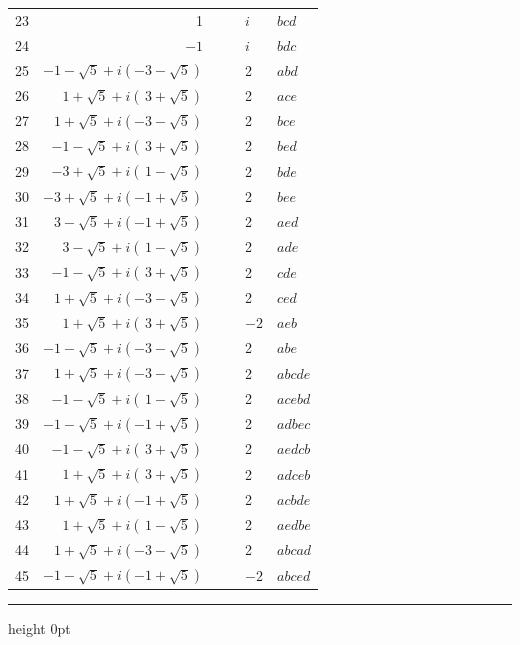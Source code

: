 \documentclass[11pt,a4paper]{article}
\begin{document}
\begin{center}
\begin{longtable}{r|r|l|l|l|l}
23 & 1 & & & $i$ & $bcd$\\
24 & $-1$ & & & $i$ & $bdc$\\
25 & $-1 - \sqrt5 + i(-3 - \sqrt5)$ & & & 2 & $abd$\\
26 & $\;1 + \sqrt5 + i(\,3 + \sqrt5)$ & & & 2 & $ace$\\
27 & $\;1 + \sqrt5 + i(-3 - \sqrt5)$ & & & 2 & $bce$\\
28 & $-1 - \sqrt5 + i(\,3 + \sqrt5)$ & & & 2 & $bed$\\
29 & $-3 + \sqrt5 + i(\,1 - \sqrt5)$ & & & 2 & $bde$\\
30 & $-3 + \sqrt5 + i(-1 + \sqrt5)$ & & & 2 & $bee$\\
31 & $\;3 - \sqrt5 + i(-1 + \sqrt5)$ & & & 2 & $aed$\\
32 & $\;3 - \sqrt5 + i(\,1 - \sqrt5)$ & & & 2 & $ade$\\
33 & $-1 - \sqrt5 + i(\,3 + \sqrt5)$ & & & 2 & $cde$\\
34 & $\;1 + \sqrt5 + i(-3 - \sqrt5)$ & & & 2 & $ced$\\
35 & $\;1 + \sqrt5 + i(\,3 + \sqrt5)$ & & & $-2$ & $aeb$\\
36 & $-1 - \sqrt5 + i(-3 - \sqrt5)$ & & & 2 & $abe$\\
37 & $\;1 + \sqrt5 + i(-3 - \sqrt5)$ & & & 2 & $abcde$\\
38 & $-1 - \sqrt5 + i(\,1 - \sqrt5)$ & & & 2 & $acebd$\\
39 & $-1 - \sqrt5 + i(-1 + \sqrt5)$ & & & 2 & $adbec$\\
40 & $-1 - \sqrt5 + i(\,3 + \sqrt5)$ & & & 2 & $aedcb$\\
41 & $\;1 + \sqrt5 + i(\,3 + \sqrt5)$ & & & 2 & $adceb$\\
42 & $\;1 + \sqrt5 + i(-1 + \sqrt5)$ & & & 2 & $acbde$\\
43 & $\;1 + \sqrt5 + i(\,1 - \sqrt5)$ & & & 2 & $aedbe$\\
44 & $\;1 + \sqrt5 + i(-3 - \sqrt5)$ & & & 2 & $abcad$\\
45 & $-1 - \sqrt5 + i(-1 + \sqrt5)$ & & & $-2$ & $abced$\\
\end{longtable}
\normalsize
\end{center}

\bigskip
\hrule height 0pt
\bigskip
\end{document}
